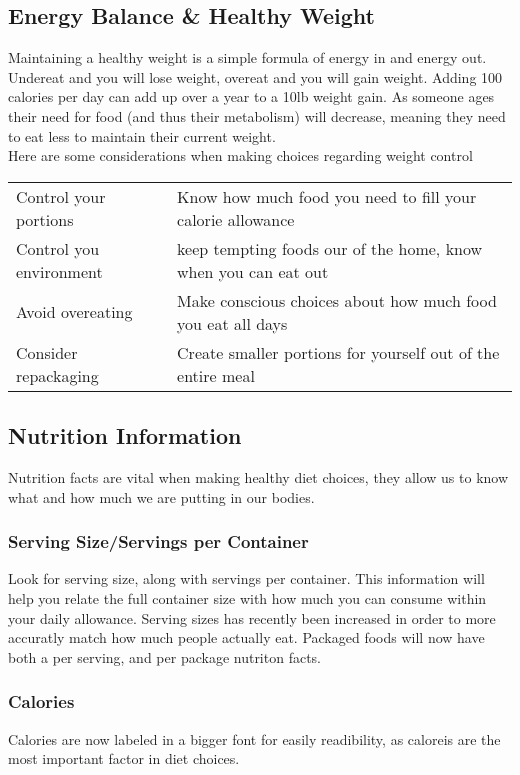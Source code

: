\documentclass[letterpaper, 11pt]{article}
\begin{document}
\subsection{Energy Balance \& Healthy Weight}
\label{sec:orgadefa11}
Maintaining a healthy weight is a simple formula of energy in and energy out. Undereat and you will lose weight, overeat and you will gain weight. Adding 100 calories per day can add up over a year to a 10lb weight gain. As someone ages their need for food (and thus their metabolism) will decrease, meaning they need to eat less to maintain their current weight.\\
Here are some considerations when making choices regarding weight control\\
\begin{center}
\begin{tabular}{ll}
Control your portions & Know how much food you need to fill your calorie allowance\\
Control you environment & keep tempting foods our of the home, know when you can eat out\\
Avoid overeating & Make conscious choices about how much food you eat all days\\
Consider repackaging & Create smaller portions for yourself out of the entire meal\\
\end{tabular}
\end{center}
\subsection{Nutrition Information}
\label{sec:orgd62450c}
Nutrition facts are vital when making healthy diet choices, they allow us to know what and how much we are putting in our bodies.\\
\subsubsection{Serving Size/Servings per Container}
\label{sec:org0006865}
Look for serving size, along with servings per container. This information will help you relate the full container size with how much you can consume within your daily allowance. Serving sizes has recently been increased in order to more accuratly match how much people actually eat. Packaged foods will now have both a per serving, and per package nutriton facts.\\
\subsubsection{Calories}
\label{sec:org2fcfa5f}
Calories are now labeled in a bigger font for easily readibility, as caloreis are the most important factor in diet choices.\\
\end{document}
